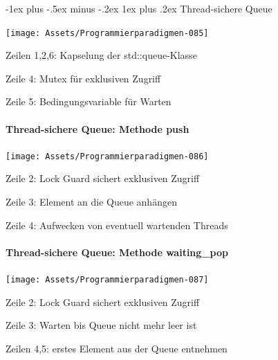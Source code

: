 \documentclass[10pt]{article}
\makeatletter
\renewcommand{\subsubsection}{\@startsection{subsubsection}{3}{0mm}%
                                {-1ex plus -.5ex minus -.2ex}%
                                {1ex plus .2ex}%
                                {\normalfont\small\bfseries}}
\makeatother
\begin{document}
  \subsubsection{Thread-sichere Queue}
  \begin{center}
    \texttt{[image: Assets/Programmierparadigmen-085]}
  \end{center}
  \begin{itemize*}
    \item Zeilen 1,2,6: Kapselung der std::queue-Klasse
    \item Zeile 4: Mutex für exklusiven Zugriff
    \item Zeile 5: Bedingungsvariable für Warten
  \end{itemize*}
  
  \paragraph{Thread-sichere Queue: Methode push}
  
  \begin{center}
    \texttt{[image: Assets/Programmierparadigmen-086]}
  \end{center}
  \begin{itemize*}
    \item Zeile 2: Lock Guard sichert exklusiven Zugriff
    \item Zeile 3: Element an die Queue anhängen
    \item Zeile 4: Aufwecken von eventuell wartenden Threads
  \end{itemize*}
  
  \paragraph{Thread-sichere Queue: Methode waiting\_pop}
  
  \begin{center}
    \texttt{[image: Assets/Programmierparadigmen-087]}
  \end{center}
  \begin{itemize*}
    \item Zeile 2: Lock Guard sichert exklusiven Zugriff
    \item Zeile 3: Warten bis Queue nicht mehr leer ist
    \item Zeilen 4,5: erstes Element aus der Queue entnehmen
  \end{itemize*}
  
\end{document}
